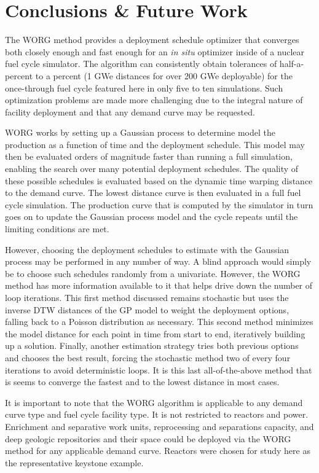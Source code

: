 \section{Conclusions \& Future Work}
\label{conclusion}

The WORG method provides a deployment schedule optimizer that converges 
both closely enough and fast enough for an \emph{in situ} optimizer inside
of a nuclear fuel cycle simulator. The algorithm can consistently obtain
tolerances of half-a-percent to a percent (1 GWe distances for over 200 GWe
deployable) for the once-through fuel cycle featured here in only five to 
ten simulations. Such optimization problems are made
more challenging due to the integral nature of facility deployment and
that any demand curve may be requested.

WORG works by setting up a Gaussian process to determine model the production
as a function of time and the deployment schedule. This model may then
be evaluated orders of magnitude faster than running a full simulation, enabling
the search over many potential deployment schedules. The quality of these
possible schedules is evaluated based on the dynamic time warping distance
to the demand curve. The lowest distance curve is then evaluated in a
full fuel cycle simulation. The production curve that is computed by the 
simulator in turn goes on to update the Gaussian process model and the
cycle repeats until the limiting conditions are met.

However, choosing the deployment schedules to estimate with the Gaussian
process may be performed in any number of way. A blind approach would
simply be to choose such schedules randomly from a univariate. However, 
the WORG method has more information available to it that helps drive 
down the number of loop iterations. This first method discussed remains 
stochastic but uses the inverse DTW distances of the GP model to 
weight the deployment options, falling back to a Poisson distribution as 
necessary. This second method minimizes the model distance for each point 
in time from start to end, iteratively building up a solution. Finally, 
another estimation strategy tries both previous options and chooses the 
best result, forcing the stochastic method two of every four iterations 
to avoid deterministic loops.  It is this last all-of-the-above method 
that is seems to converge the fastest and to the lowest distance in most 
cases.

It is important to note that the WORG algorithm is applicable to any 
demand curve type and fuel cycle facility type. It is not restricted to 
reactors and power.  Enrichment and separative work units, reprocessing
and separations capacity, and deep geologic repositories and their
space could be deployed via the WORG method for any applicable demand 
curve.  Reactors were chosen for study here as the representative keystone 
example.

